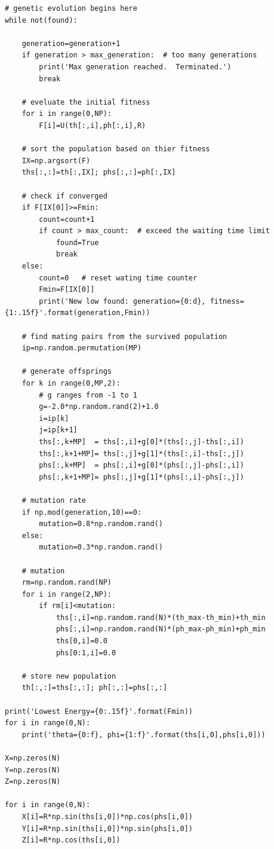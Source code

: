 \begin{verbatim}
# genetic evolution begins here
while not(found):
    
    generation=generation+1
    if generation > max_generation:  # too many generations
        print('Max generation reached.  Terminated.')
        break
    
    # eveluate the initial fitness
    for i in range(0,NP):
        F[i]=U(th[:,i],ph[:,i],R)
 
    # sort the population based on thier fitness
    IX=np.argsort(F)
    ths[:,:]=th[:,IX]; phs[:,:]=ph[:,IX] 
     
    # check if converged
    if F[IX[0]]>=Fmin:
        count=count+1
        if count > max_count:  # exceed the waiting time limit
            found=True
            break
    else:
        count=0   # reset wating time counter
        Fmin=F[IX[0]]
        print('New low found: generation={0:d}, fitness={1:.15f}'.format(generation,Fmin))
    
    # find mating pairs from the survived population
    ip=np.random.permutation(MP)
    
    # generate offsprings       
    for k in range(0,MP,2):
        # g ranges from -1 to 1
        g=-2.0*np.random.rand(2)+1.0
        i=ip[k]
        j=ip[k+1]
        ths[:,k+MP]  = ths[:,i]+g[0]*(ths[:,j]-ths[:,i])
        ths[:,k+1+MP]= ths[:,j]+g[1]*(ths[:,i]-ths[:,j])
        phs[:,k+MP]  = phs[:,i]+g[0]*(phs[:,j]-phs[:,i])
        phs[:,k+1+MP]= phs[:,j]+g[1]*(phs[:,i]-phs[:,j])

    # mutation rate              
    if np.mod(generation,10)==0:
        mutation=0.8*np.random.rand()
    else:
        mutation=0.3*np.random.rand()
        
    # mutation  
    rm=np.random.rand(NP)    
    for i in range(2,NP):
        if rm[i]<mutation:
            ths[:,i]=np.random.rand(N)*(th_max-th_min)+th_min
            phs[:,i]=np.random.rand(N)*(ph_max-ph_min)+ph_min
            ths[0,i]=0.0
            phs[0:1,i]=0.0
    
    # store new population
    th[:,:]=ths[:,:]; ph[:,:]=phs[:,:]

print('Lowest Energy={0:.15f}'.format(Fmin))
for i in range(0,N):
    print('theta={0:f}, phi={1:f}'.format(ths[i,0],phs[i,0]))

X=np.zeros(N)
Y=np.zeros(N)
Z=np.zeros(N)

for i in range(0,N):
    X[i]=R*np.sin(ths[i,0])*np.cos(phs[i,0])
    Y[i]=R*np.sin(ths[i,0])*np.sin(phs[i,0])
    Z[i]=R*np.cos(ths[i,0])


\end{verbatim}
